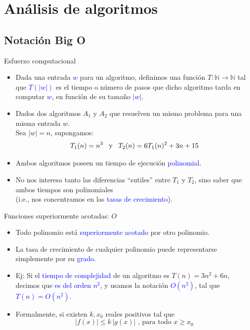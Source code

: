 \documentclass{beamer} %
\newcommand{\blue}[1]{\textcolor{blue}{#1}}
\newcommand{\redb}[1]{{\color{red!70!black}{#1}}}
\begin{document}
\section{Análisis de algoritmos}

\subsection{Notación Big O}

\begin{frame}{Esfuerzo computacional}
  \begin{itemize}
    \item<1-> Dada una entrada \blue{$w$} para un algoritmo, definimos una función $T:\mathbb{N}\to\mathbb{N}$ tal que \blue{$T(|w|)$} es el tiempo o número de pasos que dicho algoritmo tarda en computar \blue{$w$}, en función de su tamaño \blue{$|w|$}.
    \item<2-> Dados dos algoritmos $A_1$ y $A_2$ que resuelven un mismo problema para una misma entrada $w$.\\ Sea $|w|=n$, supongamos:
    $$T_1(n)=n^3\mbox{ \, y \, }T_2(n)=6T_1(n)^2+3n+15$$
    \item<3-> Ambos algoritmos poseen un tiempo de ejecución \blue{polinomial}.
    \item<4-> No nos interesa tanto las diferencias ``sutiles'' entre $T_1$ y $T_2$, sino saber que ambos tiempos son polinomiales\\
    (i.e., nos concentramos en las \blue{tasas de crecimiento}).
  \end{itemize}
\end{frame}

\begin{frame}{Funciones superiormente acotadas: $O$}
  \begin{itemize}
      \item<1-> Todo polinomio está \blue{superiormente acotado} por otro polinomio.
      \item<2-> La tasa de crecimiento de cualquier polinomio puede representarse simplemente por su \blue{grado}.
      \item<3-> Ej: Si el \blue{tiempo de complejidad} de un algoritmo es $T(n)=3n^2+6n$, decimos que \blue{es del orden $n^2$}, y usamos la notación \blue{$O(n^2)$}, tal que \blue{$T(n)=O(n^2)$}.
      \item<4-> Formalmente,
      \redb{$$f(x)=O(g(x))$$}
      si existen $k,x_0$ reales positivos tal que
      $$|f(x)|\leq k\, |g(x)|\mbox{ , para todo } x\geq x_0$$
  \end{itemize}
\end{frame}
\end{document}
